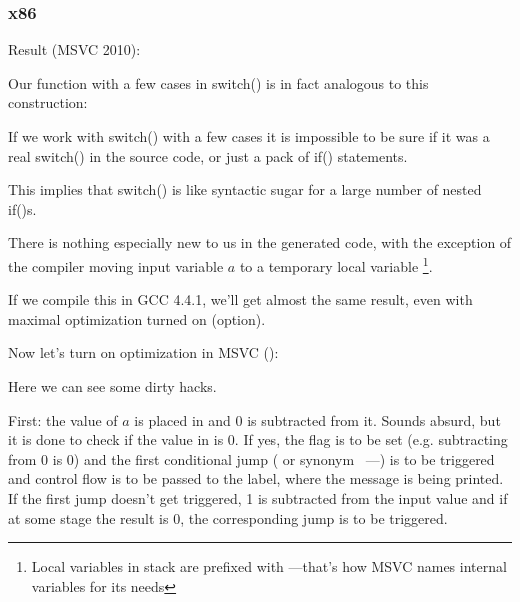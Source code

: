 \subsubsection{x86}


Result (MSVC 2010):



Our function with a few cases in switch() is in fact analogous to this construction:




If we work with switch() with a few cases it is impossible to be sure if it was
a real switch() in the source code, or just a pack of if() statements.
\myindex{\SyntacticSugar}

This implies that switch() is like syntactic sugar for a large number of nested if()s.

There is nothing especially new to us in the generated code,
with the exception of the compiler moving input variable $a$ to a temporary local variable 
\footnote{Local variables in stack are prefixed with ---that's how MSVC names internal variables for its needs}.

If we compile this in GCC 4.4.1, we'll get almost the same result, even with maximal optimization
turned on (\Othree option).


Now let's turn on optimization in MSVC (\Ox): 

\label{JMP_instead_of_RET}


Here we can see some dirty hacks.


First: the value of $a$ is placed in \EAX and 0 is subtracted from it. Sounds absurd, but it is done to check if 
the value in \EAX is 0. If yes, the \ZF flag is to be set (e.g. subtracting from 0 is 0) 
and the first conditional jump \JE ( or synonym \JZ~---) is to be triggered 
and control flow is to be passed to the  label, where the  message is being printed. 
If the first jump doesn't get triggered, 1 is subtracted from the input value and if at some stage the result is 0, 
the corresponding jump is to be triggered.

